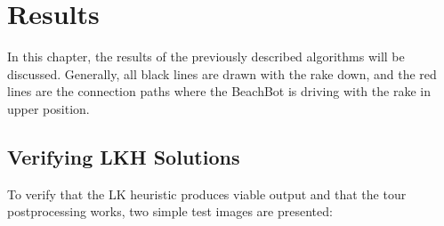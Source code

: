 \chapter{Results}

In this chapter, the results of the previously described algorithms will be discussed. Generally, all black lines are drawn with the rake down, and the red lines are the connection paths where the BeachBot is driving with the rake in upper position.

\section{Verifying LKH Solutions}

To verify that the LK heuristic produces viable output and that the tour postprocessing works, two simple test images are presented:


